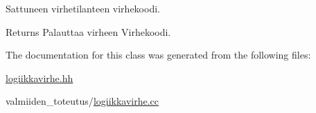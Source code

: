 Sattuneen virhetilanteen virhekoodi. 

\begin{DoxyReturn}{Returns}
Palauttaa virheen {\ttfamily Virhekoodi}. 
\end{DoxyReturn}


The documentation for this class was generated from the following files\+:\begin{DoxyCompactItemize}
\item 
\hyperlink{logiikkavirhe_8hh}{logiikkavirhe.\+hh}\item 
valmiiden\+\_\+toteutus/\hyperlink{logiikkavirhe_8cc}{logiikkavirhe.\+cc}\end{DoxyCompactItemize}
